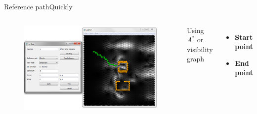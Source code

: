 \begin{frame}{Reference path}{Quickly}

\begin{columns}
\begin{figure}
\centering
\includegraphics[width = \textwidth]{./screenshot/quickly_reference_path.png}
\end{figure}

\begin{minipage}{\textwidth}
Using $ A^{*} $ or visibility graph
\begin{itemize}
\item \textbf{Start point}
\item \textbf{End point}
\end{itemize}
\end{minipage}
\end{columns}

\end{frame}

